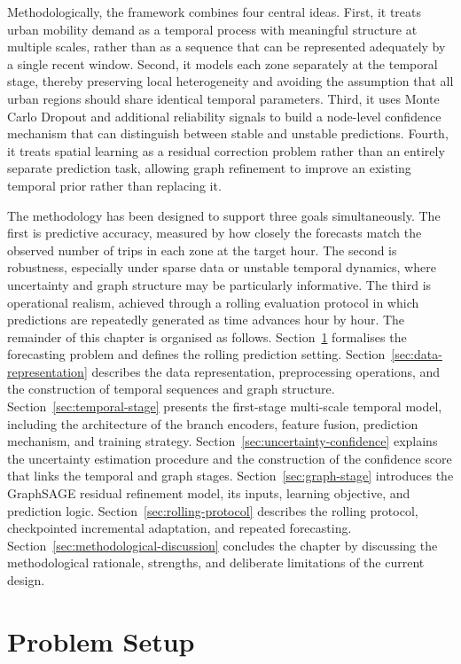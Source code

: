 \documentclass[12pt,a4paper]{report}
\begin{document}
Methodologically, the framework combines four central ideas. First, it treats urban mobility demand as a temporal process with meaningful structure at multiple scales, rather than as a sequence that can be represented adequately by a single recent window. Second, it models each zone separately at the temporal stage, thereby preserving local heterogeneity and avoiding the assumption that all urban regions should share identical temporal parameters. Third, it uses Monte Carlo Dropout and additional reliability signals to build a node-level confidence mechanism that can distinguish between stable and unstable predictions. Fourth, it treats spatial learning as a residual correction problem rather than an entirely separate prediction task, allowing graph refinement to improve an existing temporal prior rather than replacing it.

The methodology has been designed to support three goals simultaneously. The first is predictive accuracy, measured by how closely the forecasts match the observed number of trips in each zone at the target hour. The second is robustness, especially under sparse data or unstable temporal dynamics, where uncertainty and graph structure may be particularly informative. The third is operational realism, achieved through a rolling evaluation protocol in which predictions are repeatedly generated as time advances hour by hour. The remainder of this chapter is organised as follows. Section~\ref{sec:problem-setup} formalises the forecasting problem and defines the rolling prediction setting. Section~\ref{sec:data-representation} describes the data representation, preprocessing operations, and the construction of temporal sequences and graph structure. Section~\ref{sec:temporal-stage} presents the first-stage multi-scale temporal model, including the architecture of the branch encoders, feature fusion, prediction mechanism, and training strategy. Section~\ref{sec:uncertainty-confidence} explains the uncertainty estimation procedure and the construction of the confidence score that links the temporal and graph stages. Section~\ref{sec:graph-stage} introduces the GraphSAGE residual refinement model, its inputs, learning objective, and prediction logic. Section~\ref{sec:rolling-protocol} describes the rolling protocol, checkpointed incremental adaptation, and repeated forecasting. Section~\ref{sec:methodological-discussion} concludes the chapter by discussing the methodological rationale, strengths, and deliberate limitations of the current design.

\section{Problem Setup}
\label{sec:problem-setup}
\end{document}
